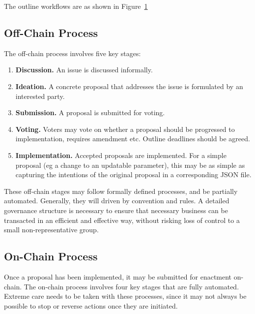 The outline workflows are as shown in Figure~\ref{fig:workflows}

\begin{figure}
\label{fig:workflows}
\end{figure}


\subsection{Off-Chain Process}

The off-chain process involves five key stages:

\begin{enumerate}
\item
  \textbf{Discussion.}  An issue is discussed informally.
\item
  \textbf{Ideation.}  A concrete proposal that addresses the issue is formulated by an interested party.
\item
  \textbf{Submission.}  A proposal is submitted for voting.
\item
  \textbf{Voting.}  Voters may vote on whether a proposal should be progressed to implementation, requires amendment etc.  Outline deadlines should be agreed.
\item
  \textbf{Implementation.}  Accepted proposals are implemented.  For a simple proposal (eg a change to an updatable parameter), this may be as simple as capturing the intentions of the original proposal in a corresponding JSON file.
\end{enumerate}

These off-chain stages may follow formally defined processes, and be partially automated.  Generally, they will driven by convention and rules.  A detailed governance structure is necessary to ensure that necessary business can
be transacted in an efficient and effective way, without risking loss of control to a small non-representative group.


\subsection{On-Chain Process}

Once a proposal has been implemented, it may be submitted for enactment on-chain.  The on-chain process involves four key stages that are fully automated.  Extreme care needs to be taken with these processes,
since it may not always be possible to stop or reverse actions once they are initiated.

